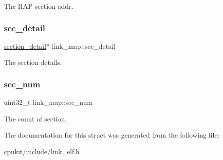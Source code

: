The R\+AP section addr. \mbox{\label{structlink__map_abd7988ed729960f7aa4336fb4eb32f64}} 
\subsubsection{\texorpdfstring{sec\_detail}{sec\_detail}}
{\footnotesize\ttfamily \mbox{\hyperlink{structsection__detail}{section\+\_\+detail}}$\ast$ link\+\_\+map\+::sec\+\_\+detail}

The section details. \mbox{\label{structlink__map_a28ec89a893caaca6ddac22ab09f33cf3}} 
\subsubsection{\texorpdfstring{sec\_num}{sec\_num}}
{\footnotesize\ttfamily uint32\+\_\+t link\+\_\+map\+::sec\+\_\+num}

The count of section. 

The documentation for this struct was generated from the following file\+:\begin{DoxyCompactItemize}
\item 
cpukit/include/link\+\_\+elf.\+h\end{DoxyCompactItemize}
